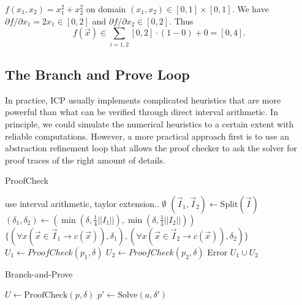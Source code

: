 \documentclass{llncs}
\begin{document}
\begin{example}
$f(x_1, x_2) = x_1^2 + x_2^2$ on domain $(x_1,x_2)\in [0,1]\times[0,1]$. We have $\partial f/\partial x_1 = 2x_1\in [0,2]$ and $\partial f/\partial x_2\in [0,2]$. Thus
$$f(\vec x)\in \sum_{i=1,2} [0,2]\cdot (1-0) + 0 = [0,4].$$
\end{example}


\subsection{The Branch and Prove Loop}

In practice, ICP usually implements complicated heuristics that are more
powerful than what can be verified through direct interval arithmetic. In
principle, we could simulate the numerical heuristics to a certain extent with
reliable computations. However, a more practical approach first is to use an
abstraction refinement loop that allows the proof checker to ask the
solver for proof traces of the right amount of details.

\begin{algorithm}
  \centering
  \caption{ProofCheck}
  \label{alg:proofcheck}
  \begin{algorithmic}[1]
             \Comment use interval arithmetic, taylor extension..
                \State \Return $\emptyset$
            \Else
                \State $(\vec I_1, \vec I_2) \gets \mathrm{Split}(\vec I)$
                \State $(\delta_1, \delta_2) \gets (\min( \delta, \frac{1}{4}||I_1||), \min( \delta, \frac{1}{4}||I_2||))$
                \State \Return $\{
                (\forall x (\vec x\in \vec I_1 \rightarrow c(\vec x)), \delta_1),
                (\forall x (\vec x\in \vec I_2 \rightarrow c(\vec x)), \delta_2)
                \}$
            \EndIf
            \State $U_1 \gets ProofCheck(p_1, \delta)$
            \State $U_2 \gets ProofCheck(p_2, \delta)$
                \State \Return Error
            \Else
                \State \Return $U_1 \cup U_2$
            \EndIf
        \EndIf
    \EndProcedure
  \end{algorithmic}
\end{algorithm}

\begin{algorithm}
  \centering
  \caption{Branch-and-Prove}
  \label{alg:branch-and-prove}
  \begin{algorithmic}[1]
        \State $U \gets \mathrm{ProofCheck}(p, \delta)$
                \State $p' \gets \mathrm{Solve}(a, \delta')$
                \State {}
            \EndFor
        \EndIf
    \EndProcedure
  \end{algorithmic}
\end{algorithm}
\end{document}
